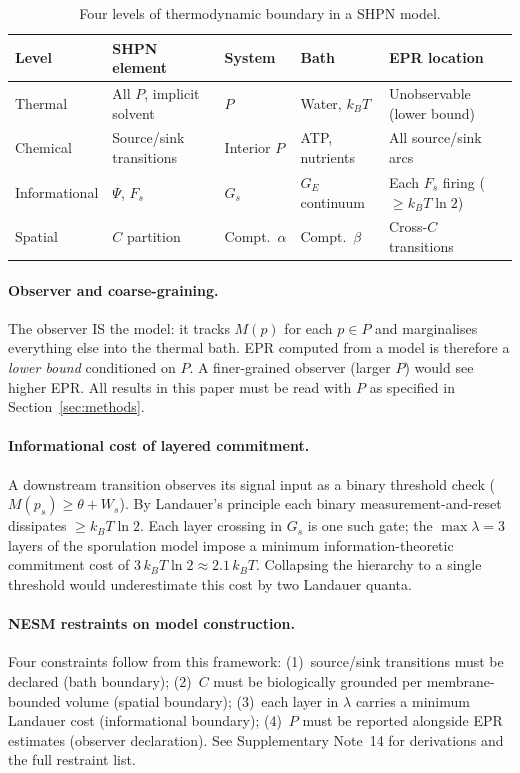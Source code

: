 \documentclass[11pt,a4paper]{article}
\begin{document}
\begin{table}[h]
\centering
\small
\caption{Four levels of thermodynamic boundary in a SHPN model.}
\label{tab:boundary_levels}
\begin{tabular}{p{1.8cm}p{2.6cm}p{2.0cm}p{2.0cm}p{3.0cm}}
\toprule
\textbf{Level} & \textbf{SHPN element} & \textbf{System} & \textbf{Bath}
  & \textbf{EPR location} \\
\midrule
Thermal & All $P$, implicit solvent & $P$ & Water, $k_BT$
  & Unobservable (lower bound) \\
Chemical & Source/sink transitions & Interior $P$ & ATP, nutrients
  & All source/sink arcs \\
Informational & $\Psi$, $F_s$ & $G_s$ & $G_E$ continuum
  & Each $F_s$ firing ($\geq k_BT\ln 2$) \\
Spatial & $C$ partition & Compt.\ $\alpha$ & Compt.\ $\beta$
  & Cross-$C$ transitions \\
\bottomrule
\end{tabular}
\end{table}

\paragraph{Observer and coarse-graining.}
The observer IS the model: it tracks $M(p)$ for each $p \in P$ and
marginalises everything else into the thermal bath.  EPR computed from a
model is therefore a \emph{lower bound} conditioned on $P$.  A finer-grained
observer (larger $P$) would see higher EPR.  All results in this paper must
be read with $P$ as specified in Section~\ref{sec:methods}.

\paragraph{Informational cost of layered commitment.}
A downstream transition observes its signal input as a binary threshold check
($M(p_s) \geq \theta + W_s$).  By Landauer's principle each binary
measurement-and-reset dissipates $\geq k_BT\ln 2$.  Each layer crossing in
$G_s$ is one such gate; the $\max\lambda = 3$ layers of the sporulation model
impose a minimum information-theoretic commitment cost of $3\,k_BT\ln 2
\approx 2.1\,k_BT$.  Collapsing the hierarchy to a single threshold would
underestimate this cost by two Landauer quanta.

\paragraph{NESM restraints on model construction.}
Four constraints follow from this framework:
(1)~source/sink transitions must be declared (bath boundary);
(2)~$C$ must be biologically grounded per membrane-bounded volume (spatial
boundary);
(3)~each layer in $\lambda$ carries a minimum Landauer cost (informational
boundary);
(4)~$P$ must be reported alongside EPR estimates (observer declaration).
See Supplementary Note~14 for derivations and the full restraint list.
\end{document}
